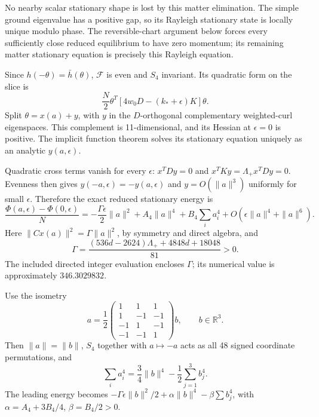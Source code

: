 \documentclass[11pt,a4paper]{article}
\begin{document}
No nearby scalar stationary shape is lost by this matter elimination. The simple ground eigenvalue has a positive gap, so its Rayleigh stationary state is locally unique modulo phase. The reversible-chart argument below forces every sufficiently close reduced equilibrium to have zero momentum; its remaining matter stationary equation is precisely this Rayleigh equation.

Since $h(-\theta)=\bar h(\theta)$, $\mathcal F$ is even and $S_4$ invariant. Its quadratic form on the slice is
\[
\frac N2\theta^T[4w_0D-(k_*+\epsilon)K]\theta.
\]
Split $\theta=x(a)+y$, with $y$ in the $D$-orthogonal complementary weighted-curl eigenspaces. This complement is 11-dimensional, and its Hessian at $\epsilon=0$ is positive. The implicit function theorem solves its stationary equation uniquely as an analytic $y(a,\epsilon)$.

Quadratic cross terms vanish for every $\epsilon$: $x^TDy=0$ and $x^TKy=\Lambda_+x^TDy=0$. Evenness then gives $y(-a,\epsilon)=-y(a,\epsilon)$ and $y=O(\|a\|^3)$ uniformly for small $\epsilon$. Therefore the exact reduced stationary energy is
\begin{equation}
\frac{\Phi(a,\epsilon)-\Phi(0,\epsilon)}N
=-\frac{\Gamma\epsilon}{2}\|a\|^2+A_4\|a\|^4+B_4\sum_i a_i^4
+O(\epsilon\|a\|^4+\|a\|^6).\label{eq:potential}
\end{equation}
Here $\|Cx(a)\|^2=\Gamma\|a\|^2$, by symmetry and direct algebra, and
\begin{equation}
\Gamma=\frac{(536d-2624)\Lambda_++4848d+18048}{81}>0.
\label{eq:Gamma}
\end{equation}
The included directed integer evaluation encloses $\Gamma$; its numerical value is approximately $346.3029832$.

Use the isometry
\[
a=\frac12\begin{pmatrix}1&1&1\\1&-1&-1\\-1&1&-1\\-1&-1&1\end{pmatrix}b,
\qquad b\in\mathbb R^3.
\]
Then $\|a\|=\|b\|$, $S_4$ together with $a\mapsto-a$ acts as all 48 signed coordinate permutations, and
\[
\sum_i a_i^4=\frac34\|b\|^4-\frac12\sum_{j=1}^3b_j^4.
\]
The leading energy becomes $-\Gamma\epsilon\|b\|^2/2+\alpha\|b\|^4-\beta\sum b_j^4$, with $\alpha=A_4+3B_4/4$, $\beta=B_4/2>0$.

\newpage
\end{document}
